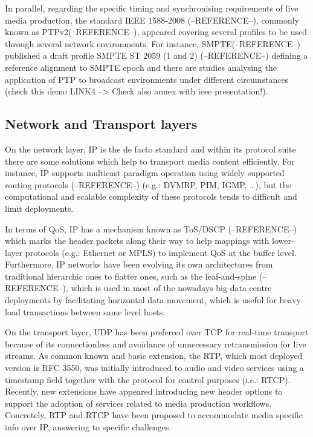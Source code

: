 In parallel, regarding the specific timing and synchronising requirements of live media production, the standard IEEE 1588-2008 (--REFERENCE--), commonly known as PTPv2(--REFERENCE--), appeared covering several profiles to be used through several network environments. For instance, SMPTE(--REFERENCE--) published a draft profile SMPTE ST 2059 (1 and 2) (--REFERENCE--) defining a reference alignment to SMPTE epoch and there are studies analysing the application of PTP to broadcast environments under different circumstances (check this demo LINK4 --> Check also annex with ieee presentation!).

\subsection{Network and Transport layers}

On the network layer, IP is the de facto standard and within its protocol suite there are some solutions which help to transport media content efficiently. For instance, IP supports multicast paradigm operation using widely supported routing protocols (--REFERENCE--) (e.g.: DVMRP, PIM, IGMP, \ldots), but the computational and scalable complexity of these protocols tends to difficult and limit deployments.

In terms of QoS, IP has a mechanism known as ToS/DSCP (--REFERENCE--) which marks the header packets along their way to help mappings with lower-layer protocols (e.g.: Ethernet or MPLS) to implement QoS at the buffer level. Furthermore, IP networks have been evolving its own architectures from traditional hierarchic ones to flatter ones, such as the leaf-and-spine (--REFERENCE--), which is used in most of the nowadays big data centre deployments by facilitating horizontal data movement, which is useful for heavy load transactions between same level hosts.

On the transport layer, UDP has been preferred over TCP for real-time transport because of its connectionless and avoidance of unnecessary retransmission for live streams. As common known and basic extension, the RTP, which most deployed version is RFC 3550, was initially introduced to audio and video services using a timestamp field together with the protocol for control purposes (i.e.: RTCP). Recently, new extensions have appeared introducing new header options to support the adoption of services related to media production workflows. Concretely, RTP and RTCP have been proposed to accommodate media specific info over IP, answering to specific challenges.

